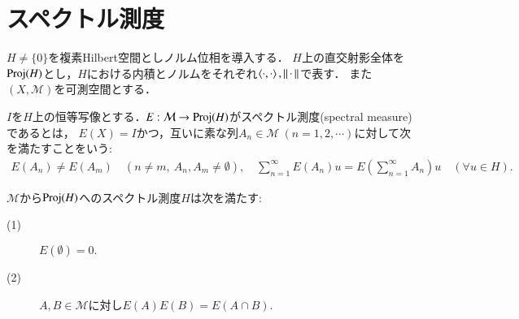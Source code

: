 \section{スペクトル測度}
	$H \neq \{0\}$を複素Hilbert空間としノルム位相を導入する．
	$H$上の直交射影全体を$\mathrm{Proj}( H )$とし，$H$における内積とノルムをそれぞれ$\inprod<\cdot,\cdot>,\Norm{\cdot}{}$で表す．
	また$(X,\mathcal{M})$を可測空間とする．
	
	\begin{screen}
		\begin{dfn}[スペクトル測度]
			$I$を$H$上の恒等写像とする．$E:\mathcal{M} \rightarrow \mathrm{Proj}( H )$がスペクトル測度(spectral measure)であるとは，
			$E(X) = I$かつ，互いに素な列$A_n \in \mathcal{M}\ (n=1,2,\cdots)$に対して次を満たすことをいう:
			\begin{align}
				E(A_n) \neq E(A_m) \quad (n \neq m,\ A_n,A_m \neq \emptyset), \quad
				\sum_{n=1}^{\infty} E(A_n)u = E(\sum_{n=1}^{\infty} A_n)u \quad (\forall u \in H).
				\label{eq:sigma_additivity_spectral_measures}
			\end{align}
			\label{dfn:spectral_measure}
		\end{dfn}
	\end{screen}
	
	\begin{screen}
		\begin{lem}[スペクトル測度の積]
			$\mathcal{M}$から$\mathrm{Proj}( H )$へのスペクトル測度$H$は次を満たす:
			\begin{description}
				\item[(1)] $E(\emptyset) = 0.$
				\item[(2)] $A,B \in \mathcal{M}$に対し$E(A) E(B) = E(A \cap B)$.
			\end{description}
			\label{lem:product_of_spectral_measure}
		\end{lem}
	\end{screen}
	

